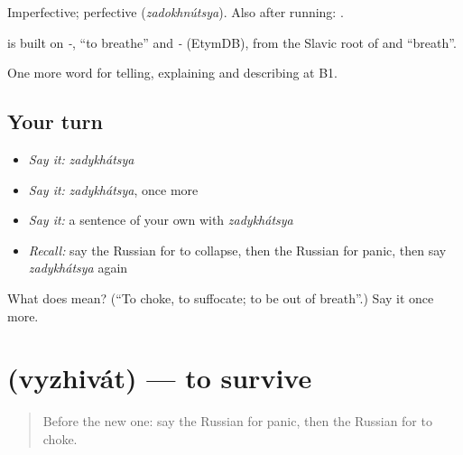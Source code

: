 Imperfective; perfective \emph{} (\emph{zadokhnútsya}). Also after running: \emph{   }.

\begin{cousinweb}
\emph{} is built on \emph{-}, \emph{} \textquotedblleft{}to breathe\textquotedblright{} and \emph{-} (EtymDB), from the Slavic root of \emph{} and \emph{} \textquotedblleft{}breath\textquotedblright{}.
\end{cousinweb}

\begin{grammarlens}[title={What you've built}]
One more word for telling, explaining and describing at B1.
\end{grammarlens}

\subsection*{Your turn}
\begin{itemize}
\raggedright
  \item \emph{Say it:} \emph{zadykhátsya}
  \item \emph{Say it:} \emph{zadykhátsya}, once more
  \item \emph{Say it:} a sentence of your own with \emph{zadykhátsya}
  \item \emph{Recall:} say the Russian for to collapse, then the Russian for panic, then say \emph{zadykhátsya} again
\end{itemize}

\begin{tcolorbox}[breakable,colback=teal!4,colframe=teal!35!black,title={Before you move on}]
What does  mean? (\textquotedblleft{}To choke, to suffocate; to be out of breath\textquotedblright{}.) Say it once more.
\end{tcolorbox}
\section[\texorpdfstring{\ru{выживать} (vyzhivát)}{выживать (vyzhivát)}]{ (vyzhivát) — to survive}

\label{lesson:RU-C302-vyzhivat}



\begin{quote}
Before the new one: say the Russian for panic, then the Russian for to choke.
\end{quote}

